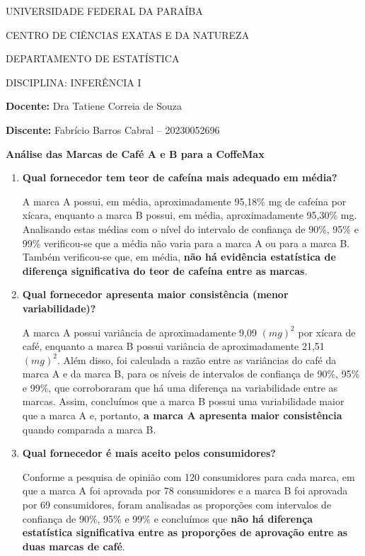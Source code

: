 \documentclass[11pt]{article}
\begin{document}
\begin{center}
UNIVERSIDADE FEDERAL DA PARAÍBA

CENTRO DE CIÊNCIAS EXATAS E DA NATUREZA

DEPARTAMENTO DE ESTATÍSTICA

DISCIPLINA: INFERÊNCIA I
\end{center}

\textbf{Docente:} Dra Tatiene Correia de Souza

\textbf{Discente:} Fabrício Barros Cabral -- 20230052696

\begin{center}
{\Large \textbf{Análise das Marcas de Café A e B para a CoffeMax}}
\end{center}

\begin{enumerate}
    \item \textbf{Qual fornecedor tem teor de cafeína mais adequado em média?}

    A marca A possui, em média, aproximadamente 95,18\% mg de cafeína por
    xícara, enquanto a marca B possui, em média, aproximadamente 95,30\% mg.
    Analisando estas médias com o nível do intervalo de confiança de 90\%, 95\%
    e 99\% verificou-se que a média não varia para a marca A ou para a marca B.
    Também verificou-se que, em média, \textbf{não há evidência estatística de
    diferença significativa do teor de cafeína entre as marcas}.

    \item \textbf{Qual fornecedor apresenta maior consistência (menor
    variabilidade)?}

    A marca A possui variância de aproximadamente 9,09 $(mg)^2$ por xícara de
    café, enquanto a marca B possui variância de aproximadamente 21,51 $(mg)^2$.
    Além disso, foi calculada a razão entre as variâncias do café da marca A e
    da marca B, para os níveis de intervalos de confiança de 90\%, 95\% e 99\%,
    que corroboraram que há uma diferença na variabilidade entre as marcas.
    Assim, concluímos que a marca B possui uma variabilidade maior que a marca A
    e, portanto, \textbf{a marca A apresenta maior consistência} quando
    comparada a marca B.

    \item \textbf{Qual fornecedor é mais aceito pelos consumidores?}

    Conforme a pesquisa de opinião com 120 consumidores para cada marca, em que
    a marca A foi aprovada por 78 consumidores e a marca B foi aprovada por 69
    consumidores, foram analisadas as proporções com intervalos de confiança de
    90\%, 95\% e 99\% e concluímos que \textbf{não há diferença estatística
    significativa entre as proporções de aprovação entre as duas marcas de
    café}.


\end{enumerate}
\end{document}
